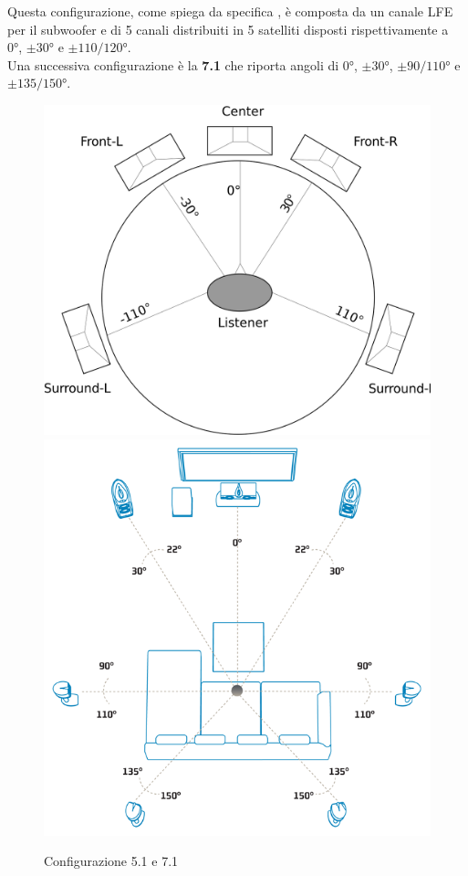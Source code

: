 \documentclass[12pt,a4paper]{report}
\begin{document}
Questa configurazione, come spiega da specifica \cite{5.1}, è composta da un canale LFE per il subwoofer e di 5 canali distribuiti in 5 satelliti disposti rispettivamente a 0°, $\pm30°$ e $\pm110/120°$.\\

Una successiva configurazione è la \textbf{7.1} che riporta angoli di 0°, $\pm30°$, $\pm90/110°$ e $\pm135/150°$.\\

\begin{figure}[htbp]
	\centering
	\includegraphics[scale=0.18]{figures/5-1.png}\includegraphics[scale=0.34]{figures/7-1.png}
	\caption {Configurazione 5.1 e 7.1} 
	\label{fig:5.1}
	\end{figure}
  
\end{document}
